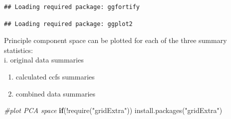\documentclass[
]{article}
\newenvironment{Shaded}{\begin{snugshade}}{\end{snugshade}}
\newcommand{\AttributeTok}[1]{\textcolor[rgb]{0.77,0.63,0.00}{#1}}
\newcommand{\CommentTok}[1]{\textcolor[rgb]{0.56,0.35,0.01}{\textit{#1}}}
\newcommand{\ControlFlowTok}[1]{\textcolor[rgb]{0.13,0.29,0.53}{\textbf{#1}}}
\newcommand{\FunctionTok}[1]{\textcolor[rgb]{0.00,0.00,0.00}{#1}}
\newcommand{\NormalTok}[1]{#1}
\newcommand{\OtherTok}[1]{\textcolor[rgb]{0.56,0.35,0.01}{#1}}
\newcommand{\SpecialCharTok}[1]{\textcolor[rgb]{0.00,0.00,0.00}{#1}}
\newcommand{\StringTok}[1]{\textcolor[rgb]{0.31,0.60,0.02}{#1}}
\begin{document}
\begin{verbatim}
## Loading required package: ggfortify
\end{verbatim}

\begin{verbatim}
## Loading required package: ggplot2
\end{verbatim}

\begin{Shaded}
\end{Shaded}

Principle component space can be plotted for each of the three summary
statistics:\\
i. original data summaries

\begin{enumerate}
\def\labelenumi{\roman{enumi}.}
\setcounter{enumi}{1}
\item
  calculated ccfs summaries
\item
  combined data summaries
\end{enumerate}

\begin{Shaded}
\begin{Highlighting}[]
\CommentTok{\#plot PCA space}
\ControlFlowTok{if}\NormalTok{(}\SpecialCharTok{!}\FunctionTok{require}\NormalTok{(}\StringTok{"gridExtra"}\NormalTok{)) }\FunctionTok{install.packages}\NormalTok{(}\StringTok{"gridExtra"}\NormalTok{)}
\end{Highlighting}
\end{Shaded}
\end{document}
